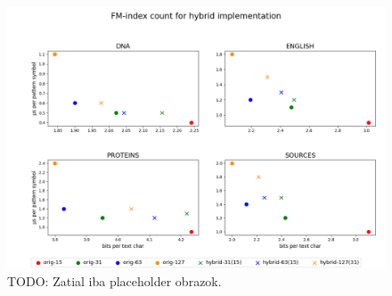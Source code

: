 \begin{figure}
	\centerline{
		\includegraphics[width=\textwidth, height=0.4\textheight]{images/vysledky_sdsl_hybrid_count}
	}
	\caption[TODO]{TODO: Zatial iba placeholder obrazok.
	}
	\label{obr:benchmark_sdsl_hybrid_count}
\end{figure}




